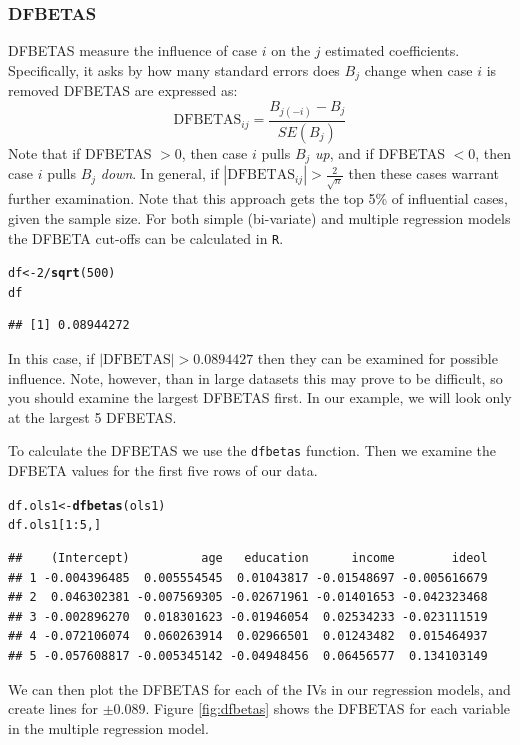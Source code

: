 \documentclass[11pt,openany]{book}
\makeatletter
\newcommand{\hlnum}[1]{\textcolor[rgb]{0.686,0.059,0.569}{#1}}%
\newcommand{\hlopt}[1]{\textcolor[rgb]{0,0,0}{#1}}%
\newcommand{\hlstd}[1]{\textcolor[rgb]{0.345,0.345,0.345}{#1}}%
\newcommand{\hlkwb}[1]{\textcolor[rgb]{0.69,0.353,0.396}{#1}}%
\newcommand{\hlkwd}[1]{\textcolor[rgb]{0.737,0.353,0.396}{\textbf{#1}}}%
\newenvironment{kframe}{%
 \def\at@end@of@kframe{}%
 \ifinner\ifhmode%
  \def\at@end@of@kframe{\end{minipage}}%
  \begin{minipage}{\columnwidth}%
 \fi\fi%
 \def\FrameCommand##1{\hskip\@totalleftmargin \hskip-\fboxsep
 \colorbox{shadecolor}{##1}\hskip-\fboxsep
     \hskip-\linewidth \hskip-\@totalleftmargin \hskip\columnwidth}%
 \MakeFramed {\advance\hsize-\width
   \@totalleftmargin\z@ \linewidth\hsize
   \@setminipage}}%
 {\par\unskip\endMakeFramed%
 \at@end@of@kframe}
\newenvironment{knitrout}{}{} %
\renewenvironment{knitrout}{\begin{singlespace}}{\end{singlespace}}
\makeatother
\begin{document}
\subsubsection{DFBETAS} 
DFBETAS measure the influence of case $i$ on the $j$ estimated coefficients. Specifically, it asks by how many standard errors does $B_j$ change when case $i$ is removed DFBETAS are expressed as:
\begin{equation}
  \label{eq:dfbeta}
  \text{DFBETAS}_{ij} = \frac{B_{j(-i)}-B_j}{SE(B_j)}
\end{equation}
Note that if DFBETAS $ > 0$, then case $i$ pulls $B_j$ \textit{up}, and  if DFBETAS $ < 0$, then case $i$ pulls $B_j$ \textit{down}.  In general, if $|\text{DFBETAS}_{ij}| > \frac{2}{\sqrt{n}}$ then these cases warrant further examination. Note that this approach gets the top 5\% of influential cases, given the sample size. For both simple (bi-variate) and  multiple regression models the DFBETA cut-offs can be calculated in \texttt{R}.  
\begin{knitrout}
\color{fgcolor}\begin{kframe}
\begin{alltt}
\hlstd{df} \hlkwb{<-} \hlnum{2}\hlopt{/}\hlkwd{sqrt}\hlstd{(}\hlnum{500}\hlstd{)}
\hlstd{df}
\end{alltt}
\begin{verbatim}
## [1] 0.08944272
\end{verbatim}
\end{kframe}
\end{knitrout}
\noindent In this case, if $|\text{DFBETAS}| > 0.0894427$ then they can be examined for  possible influence. Note, however, than in large datasets this may prove to be difficult,  so you should examine the largest DFBETAS first. In our example, we will look only at the largest 5 DFBETAS.

To calculate the DFBETAS we use the \texttt{dfbetas} function. Then we examine the DFBETA values for the first five rows of our data. 
\begin{knitrout}
\color{fgcolor}\begin{kframe}
\begin{alltt}
\hlstd{df.ols1} \hlkwb{<-} \hlkwd{dfbetas}\hlstd{(ols1)}
\hlstd{df.ols1[}\hlnum{1}\hlopt{:}\hlnum{5}\hlstd{,]}
\end{alltt}
\begin{verbatim}
##    (Intercept)          age   education      income        ideol
## 1 -0.004396485  0.005554545  0.01043817 -0.01548697 -0.005616679
## 2  0.046302381 -0.007569305 -0.02671961 -0.01401653 -0.042323468
## 3 -0.002896270  0.018301623 -0.01946054  0.02534233 -0.023111519
## 4 -0.072106074  0.060263914  0.02966501  0.01243482  0.015464937
## 5 -0.057608817 -0.005345142 -0.04948456  0.06456577  0.134103149
\end{verbatim}
\end{kframe}
\end{knitrout}
We can then plot the DFBETAS for each of the IVs in our  regression models, and create lines for $\pm 0.089$.  Figure \ref{fig:dfbetas} shows the DFBETAS for each variable in the multiple regression model.   
\end{document}
